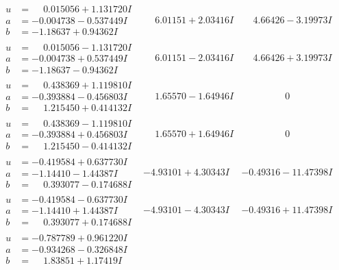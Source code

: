 \documentclass[1p]{elsarticle_modified}
\theoremstyle{definition}
\begin{document}
$$\begin{array}{c|c|c}
\begin{aligned}
u &= \phantom{-}0.015056 + 1.131720 I \\
a &= -0.004738 - 0.537449 I \\
b &= -1.18637 + 0.94362 I\end{aligned}
 & \phantom{-}6.01151 + 2.03416 I & \phantom{-}4.66426 - 3.19973 I \\ \hline\begin{aligned}
u &= \phantom{-}0.015056 - 1.131720 I \\
a &= -0.004738 + 0.537449 I \\
b &= -1.18637 - 0.94362 I\end{aligned}
 & \phantom{-}6.01151 - 2.03416 I & \phantom{-}4.66426 + 3.19973 I \\ \hline\begin{aligned}
u &= \phantom{-}0.438369 + 1.119810 I \\
a &= -0.393884 - 0.456803 I \\
b &= \phantom{-}1.215450 + 0.414132 I\end{aligned}
 & \phantom{-}1.65570 - 1.64946 I & \phantom{-0.000000 } 0 \\ \hline\begin{aligned}
u &= \phantom{-}0.438369 - 1.119810 I \\
a &= -0.393884 + 0.456803 I \\
b &= \phantom{-}1.215450 - 0.414132 I\end{aligned}
 & \phantom{-}1.65570 + 1.64946 I & \phantom{-0.000000 } 0 \\ \hline\begin{aligned}
u &= -0.419584 + 0.637730 I \\
a &= -1.14410 - 1.44387 I \\
b &= \phantom{-}0.393077 - 0.174688 I\end{aligned}
 & -4.93101 + 4.30343 I & -0.49316 - 11.47398 I \\ \hline\begin{aligned}
u &= -0.419584 - 0.637730 I \\
a &= -1.14410 + 1.44387 I \\
b &= \phantom{-}0.393077 + 0.174688 I\end{aligned}
 & -4.93101 - 4.30343 I & -0.49316 + 11.47398 I \\ \hline\begin{aligned}
u &= -0.787789 + 0.961220 I \\
a &= -0.934268 - 0.326848 I \\
b &= \phantom{-}1.83851 + 1.17419 I\end{aligned}

\end{array}$$
\end{document}
